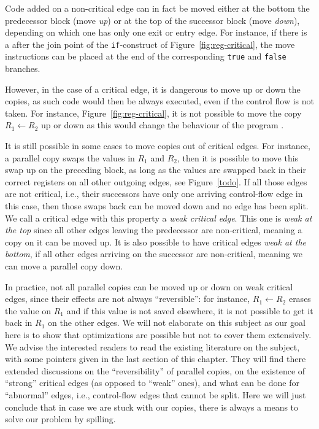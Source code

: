 {Code added on a non-critical edge can in fact be moved either at the bottom the predecessor block (move \emph{up}) or at the top of the successor block (move \emph{down}), depending on which one has only one exit or entry edge.
For instance, if there is a \phifun after the join point of the \texttt{if}-construct of Figure~\ref{fig:reg-critical}, the move instructions can be placed at the end of the corresponding \texttt{true} and \texttt{false} branches.

However, in the case of a critical edge, it is dangerous to move up or down the copies, as such code would then be always executed, even if the control flow is not taken.
For instance, Figure~\ref{fig:reg-critical}, it is not possible to move the copy $R_1 \gets R_2$ up or down as this would change the behaviour of the program .

It is still possible in some cases to move copies out of critical edges.
For instance, a parallel copy swaps the values in $R_1$ and $R_2$, then it is possible to move this swap up on the preceding block, as long as the values are swapped back in their correct registers on all other outgoing edges, see Figure~\ref{todo}.
If all those edges are not critical, i.e., their successors have only one arriving control-flow edge in this case, then those swaps back can be moved down and no edge has been split.
We call a critical edge with this property a \emph{weak critical edge}.
This one is \emph{weak at the top} since all other edges leaving the predecessor are non-critical, meaning a copy on it can be moved up.
It is also possible to have critical edges \emph{weak at the bottom}, if all other edges arriving on the successor are non-critical, meaning we can move a parallel copy down.

In practice, not all parallel copies can be moved up or down on weak critical edges, since their effects are not always ``reversible'':
for instance, $R_1 \gets R_2$ erases the value on $R_1$ and if this value is not saved elsewhere, it is not possible to get it back in $R_1$ on the other edges.
We will not elaborate on this subject as our goal here is to show that optimizations are possible but not to cover them extensively.
We advise the interested readers to read the existing literature on the subject, with some pointers given in the last section of this chapter.
They will find there extended discussions on the ``reversibility'' of parallel copies, on the existence of ``strong'' critical edges (as opposed to ``weak'' ones), and what can be done for ``abnormal'' edges, i.e., control-flow edges that cannot be split.
Here we will just conclude that in case we are stuck with our copies, there is always a means to solve our problem by spilling.



}
